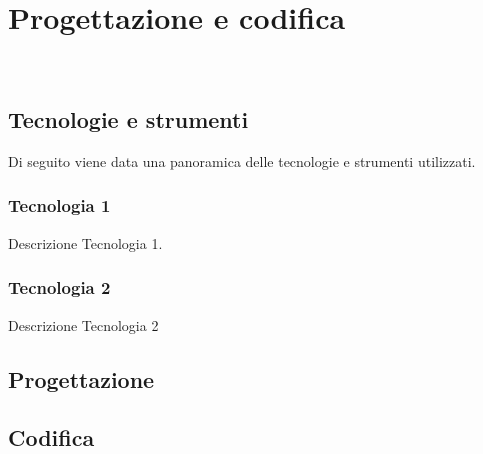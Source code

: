 
\chapter{Progettazione e codifica}
\label{cap:progettazione-codifica}

\\

\section{Tecnologie e strumenti}
\label{sec:tecnologie-strumenti}

Di seguito viene data una panoramica delle tecnologie e strumenti utilizzati.

\subsection*{Tecnologia 1}
Descrizione Tecnologia 1.

\subsection*{Tecnologia 2}
Descrizione Tecnologia 2

\section{Progettazione}
\label{sec:progettazione}

\section{Codifica}


